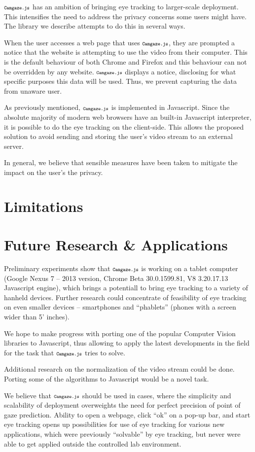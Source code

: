 \documentclass[annual]{acmsiggraph}
\newcommand{\Acronym}[1]{\ensuremath{{\small{\texttt{#1}}}}}
\newcommand{\Name}{\Acronym{Camgaze.js}} \newcommand{\False}{\Constant{false}}
\newcommand{\Constant}[1]{\ensuremath{\small{\texttt{#1}}}}
\begin{document}
$\Name$ has an ambition of bringing eye tracking to larger-scale deployment.
This intensifies the need to address the privacy concerns some users might
have. The library we describe attempts to do this in several ways.

When the user accesses a web page that uses $\Name$, they are prompted a
notice that the website is attempting to use the video from their computer.
This is the default behaviour of both Chrome and Firefox and this behaviour can
not be overridden by any website. $\Name$ displays a notice, disclosing for
what specific purposes this data will be used. Thus, we prevent capturing the
data from unaware user.

As previously mentioned, $\Name$ is implemented in Javascript. Since the
absolute majority of modern web browsers have an built-in Javascript
interpreter, it is possible to do the eye tracking on the client-side. This
allows the proposed solution to avoid sending and storing the user’s video
stream to an external server.

In general, we believe that sensible measures have been taken to mitigate the
impact on the user’s the privacy.

\section{Limitations}

\section{Future Research \& Applications}

Preliminary experiments show that $\Name$ is working on a tablet computer
(Google Nexus 7 -- 2013 version, Chrome Beta 30.0.1599.81, V8 3.20.17.13
Javascript engine), which brings a potentiall to bring eye tracking to a
variety of hanheld devices. Further research could concentrate of feasibility
of eye tracking on even smaller devices -- smartphones and “phablets” (phones
with a screen wider than 5’ inches).

We hope to make progress with porting one of the popular Computer Vision
libraries to Javascript, thus allowing to apply the latest developments in the
field for the task that $\Name$ tries to solve.

Additional research on the normalization of the video stream could be done.
Porting some of the algorithms to Javascript would be a novel task. 

We believe that $\Name$ should be used in cases, where the simplicity and
scalability of deployment overweights the need for perfect precision of point
of gaze prediction. Ability to open a webpage, click “ok” on a pop-up bar, and
start eye tracking opens up possibilities for use of eye tracking for various
new applications, which were previously “solvable” by eye tracking, but never
were able to get applied outside the controlled lab environment.
\end{document}

